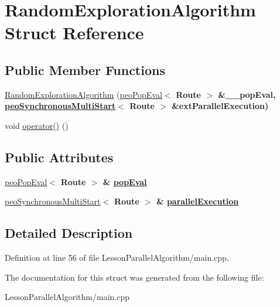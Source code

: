 \hypertarget{structRandomExplorationAlgorithm}{
\section{Random\-Exploration\-Algorithm Struct Reference}
\label{structRandomExplorationAlgorithm}
}
\subsection*{Public Member Functions}
\begin{CompactItemize}
\item 
\hypertarget{structRandomExplorationAlgorithm_ed4847c164759fbb1168948d3620037c}{
\hyperlink{structRandomExplorationAlgorithm_ed4847c164759fbb1168948d3620037c}{Random\-Exploration\-Algorithm} (\hyperlink{classpeoPopEval}{peo\-Pop\-Eval}$<$ \bf{Route} $>$ \&\_\-\_\-pop\-Eval, \hyperlink{classpeoSynchronousMultiStart}{peo\-Synchronous\-Multi\-Start}$<$ \bf{Route} $>$ \&ext\-Parallel\-Execution)}
\label{structRandomExplorationAlgorithm_ed4847c164759fbb1168948d3620037c}

\item 
\hypertarget{structRandomExplorationAlgorithm_3a7b3cc174726fff45985854c3d1b812}{
void \hyperlink{structRandomExplorationAlgorithm_3a7b3cc174726fff45985854c3d1b812}{operator()} ()}
\label{structRandomExplorationAlgorithm_3a7b3cc174726fff45985854c3d1b812}

\end{CompactItemize}
\subsection*{Public Attributes}
\begin{CompactItemize}
\item 
\hypertarget{structRandomExplorationAlgorithm_e9fbab7402f290c62224cedebd9de0a4}{
\hyperlink{classpeoPopEval}{peo\-Pop\-Eval}$<$ \bf{Route} $>$ \& \hyperlink{structRandomExplorationAlgorithm_e9fbab7402f290c62224cedebd9de0a4}{pop\-Eval}}
\label{structRandomExplorationAlgorithm_e9fbab7402f290c62224cedebd9de0a4}

\item 
\hypertarget{structRandomExplorationAlgorithm_e36e837e956772738773364cd71201de}{
\hyperlink{classpeoSynchronousMultiStart}{peo\-Synchronous\-Multi\-Start}$<$ \bf{Route} $>$ \& \hyperlink{structRandomExplorationAlgorithm_e36e837e956772738773364cd71201de}{parallel\-Execution}}
\label{structRandomExplorationAlgorithm_e36e837e956772738773364cd71201de}

\end{CompactItemize}


\subsection{Detailed Description}




Definition at line 56 of file Lesson\-Parallel\-Algorithm/main.cpp.

The documentation for this struct was generated from the following file:\begin{CompactItemize}
\item 
Lesson\-Parallel\-Algorithm/main.cpp\end{CompactItemize}
